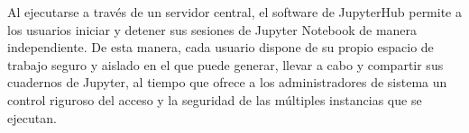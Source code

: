\begin{doublespace}
\begin{multicols}{2}
    Al ejecutarse a través de un servidor central, el software de JupyterHub permite a los usuarios iniciar y detener sus sesiones de Jupyter Notebook de manera independiente. De esta manera, cada usuario dispone de su propio espacio de trabajo seguro y aislado en el que puede generar, llevar a cabo y compartir sus cuadernos de Jupyter, al tiempo que ofrece a los administradores de sistema un control riguroso del acceso y la seguridad de las múltiples instancias que se ejecutan.

  \end{multicols}

  \mylinespacing
  \mylinespacing
  \begin{tightcenter}
  \end{tightcenter}
\end{doublespace}